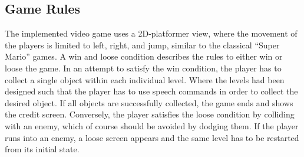 \subsection{Game Rules}\label{sec:game_design_rules}
The implemented video game uses a 2D-platformer view, where the movement of the players is limited to left, right, and jump, similar to the classical \enquote{Super Mario} games.
A win and loose condition describes the rules to either win or loose the game.
In an attempt to satisfy the win condition, the player has to collect a single object within each individual level.
Where the levels had been designed such that the player has to use speech commands in order to collect the desired object.
If all objects are successfully collected, the game ends and shows the credit screen.
Conversely, the player satisfies the loose condition by colliding with an enemy, which of course should be avoided by dodging them.
If the player runs into an enemy, a loose screen appears and the same level has to be restarted from its initial state.



